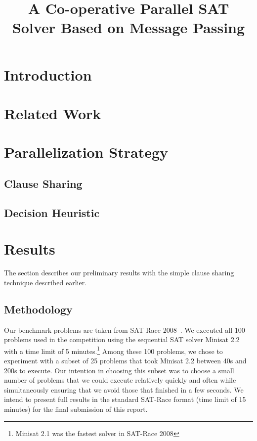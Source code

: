 \documentclass[letterpaper, compsoc, conference]{IEEEtran}
\begin{document}
\title{A Co-operative Parallel SAT Solver Based on Message Passing}

\author{
    \and {}
}
\maketitle

\begin{abstract}
\end{abstract}

\section{Introduction}
\section{Related Work}
\section{Parallelization Strategy}
\subsection{Clause Sharing}
\subsection{Decision Heuristic}
\section{Results}

The section describes our preliminary results with the simple clause sharing technique described earlier.

\subsection{Methodology}
Our benchmark problems are taken from SAT-Race 2008~\cite{SATRace2008}. We
executed all 100 problems used in the competition using the sequential SAT
solver Minisat 2.2 with a time limit of 5 minutes.\footnote{Minisat 2.1 was the
fastest solver in SAT-Race 2008} Among these 100 problems, we chose to
experiment with a subset of 25 problems that took Minisat 2.2 between 40s and
200s to execute. Our intention in choosing this subset was to choose a small
number of problems that we could execute relatively quickly and often while
simultaneously ensuring that we avoid those that finished in a few seconds.  We
intend to present full results in the standard SAT-Race format (time limit of
15 minutes) for the final submission of this report.
\end{document}
